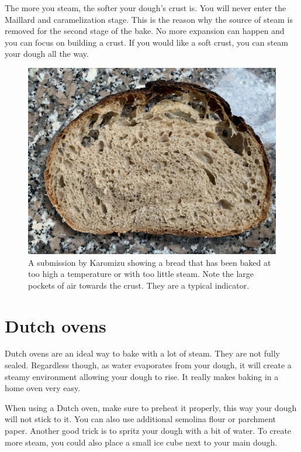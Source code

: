 The more you steam, the softer your dough's crust is. You will never
enter the Maillard and caramelization stage. This
is the reason why the source of steam is removed
for the second stage of the bake. No more expansion can
happen and you can focus on building a crust. If you
would like a soft crust, you can steam your dough all the
way.

\begin{figure}[!htb]
  \includegraphics[width=\textwidth]{baking-too-hot}
  \caption{A submission by Karomizu showing a bread that has been baked
  at too high a temperature or with too little steam. Note the large
  pockets of air towards the crust. They are a typical indicator.}
\end{figure}

\section{Dutch ovens}

Dutch ovens are an ideal way to bake with a lot of
steam. They are not fully sealed. Regardless though,
as water evaporates from your dough, it will create a steamy
environment allowing your dough to rise. It really
makes baking in a home oven very easy.

When using a Dutch oven, make sure to preheat it properly,
this way your dough will not stick to it. You can also
use additional semolina flour or parchment paper. Another
good trick is to spritz your dough with a bit of water.
To create more steam, you could also place a small ice cube
next to your main dough.

